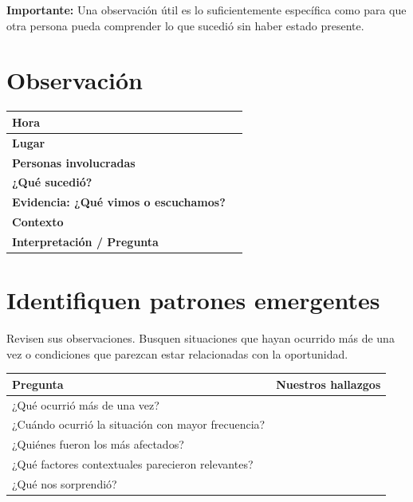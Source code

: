 \documentclass[12pt,a4paper]{article}
\begin{document}
	\vspace{0.2cm}
	
	\textbf{Importante:} Una observación útil es lo suficientemente específica como para que otra persona pueda comprender lo que sucedió sin haber estado presente.
	
	\section*{Observación}
	
	\begin{center}
		\small
		\begin{tabular}{|L{0.22\textwidth}|L{0.61\textwidth}|}
			\hline
			\textbf{Hora} & \rule{0pt}{0.45cm} \\
			\hline
			\textbf{Lugar} & \rule{0pt}{0.45cm} \\
			\hline
			\textbf{Personas involucradas} & \rule{0pt}{0.45cm} \\
			\hline
			\textbf{¿Qué sucedió?} & \rule{0pt}{0.75cm} \\
			\hline
			\textbf{Evidencia: ¿Qué vimos o escuchamos?} & \rule{0pt}{0.75cm} \\
			\hline
			\textbf{Contexto} & \rule{0pt}{0.65cm} \\
			\hline
			\textbf{Interpretación / Pregunta} & \rule{0pt}{0.65cm} \\
			\hline
		\end{tabular}
	\end{center}
	
	\section*{Identifiquen patrones emergentes}
	
	Revisen sus observaciones. Busquen situaciones que hayan ocurrido más de una vez o condiciones que parezcan estar relacionadas con la oportunidad.
	
	\begin{center}
		\small
		\begin{tabular}{|m{}|m{}|}
			\hline
			\textbf{Pregunta} & \textbf{Nuestros hallazgos} \\
			\hline
			¿Qué ocurrió más de una vez? & \rule{0pt}{2.3cm} \\
			\hline
			¿Cuándo ocurrió la situación con mayor frecuencia? & \rule{0pt}{2.3cm} \\
			\hline
			¿Quiénes fueron los más afectados? & \rule{0pt}{2.3cm} \\
			\hline
			¿Qué factores contextuales parecieron relevantes? & \rule{0pt}{2.5cm} \\
			\hline
			¿Qué nos sorprendió? & \rule{0pt}{2.3cm} \\
			\hline
		\end{tabular}
	\end{center}
	
\end{document}
